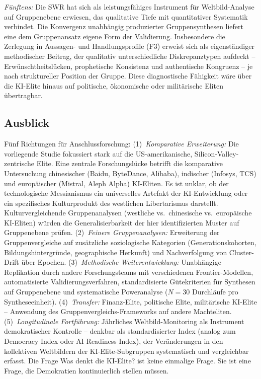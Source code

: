 \documentclass[12pt,a4paper]{article}
\begin{document}
\emph{Fünftens:} Die SWR hat sich als leistungsfähiges Instrument für Weltbild-Analyse auf Gruppenebene erwiesen, das qualitative Tiefe mit quantitativer Systematik verbindet. Die Konvergenz unabhängig produzierter Gruppensynthesen liefert eine dem Gruppenansatz eigene Form der Validierung. Insbesondere die Zerlegung in Aussagen- und Handlungsprofile (F3) erweist sich als eigenständiger methodischer Beitrag, der qualitativ unterschiedliche Diskrepanztypen aufdeckt -- Erwünschtheitslücken, prophetische Konsistenz und authentische Kongruenz -- je nach struktureller Position der Gruppe. Diese diagnostische Fähigkeit wäre über die KI-Elite hinaus auf politische, ökonomische oder militärische Eliten übertragbar.

\subsection{Ausblick}

Fünf Richtungen für Anschlussforschung: (1)~\emph{Komparative Erweiterung:} Die vorliegende Studie fokussiert stark auf die US-amerikanische, Silicon-Valley-zentrische Elite. Eine zentrale Forschungslücke betrifft die komparative Untersuchung chinesischer (Baidu, ByteDance, Alibaba), indischer (Infosys, TCS) und europäischer (Mistral, Aleph Alpha) KI-Eliten. Es ist unklar, ob der \glqq technologische Messianismus\grqq{} ein universelles Artefakt der KI-Entwicklung oder ein spezifisches Kulturprodukt des westlichen Libertarismus darstellt. Kulturvergleichende Gruppenanalysen (westliche vs.\ chinesische vs.\ europäische KI-Eliten) würden die Generalisierbarkeit der hier identifizierten Muster auf Gruppenebene prüfen. (2)~\emph{Feinere Gruppenanalysen:} Erweiterung der Gruppenvergleiche auf zusätzliche soziologische Kategorien (Generationskohorten, Bildungshintergründe, geographische Herkunft) und Nachverfolgung von Cluster-Drift über Epochen. (3)~\emph{Methodische Weiterentwicklung:} Unabhängige Replikation durch andere Forschungsteams mit verschiedenen Frontier-Modellen, automatisierte Validierungsverfahren, standardisierte Gütekriterien für Synthesen auf Gruppenebene und systematische Poweranalyse ($N = 30$ Durchläufe pro Syntheseeinheit). (4)~\emph{Transfer:} Finanz-Elite, politische Elite, militärische KI-Elite -- Anwendung des Gruppenvergleichs-Frameworks auf andere Machteliten. (5)~\emph{Longitudinale Fortführung:} Jährliches Weltbild-Monitoring als Instrument demokratischer Kontrolle -- denkbar als standardisierter Index (analog zum Democracy Index oder AI Readiness Index), der Veränderungen in den kollektiven Weltbildern der KI-Elite-Subgruppen systematisch und vergleichbar erfasst. Die Frage \glqq Was denkt die KI-Elite?\grqq{} ist keine einmalige Frage. Sie ist eine Frage, die Demokratien kontinuierlich stellen müssen.
\end{document}
